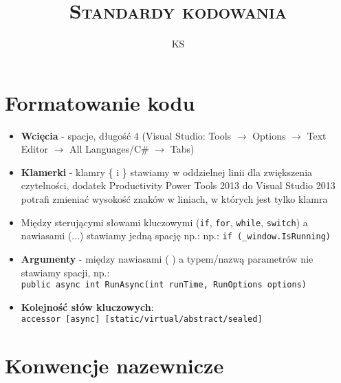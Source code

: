 \documentclass[a4paper]{article}
\title{\textsc{Standardy kodowania}}
\author{KS}
\begin{document}
	\maketitle
	
	\section{Formatowanie kodu}
	\begin{itemize}
		\item \textbf{Wcięcia} - spacje, długość 4 (Visual Studio: Tools $\rightarrow$ Options $\rightarrow$ Text Editor $\rightarrow$ All Languages/C\# $\rightarrow$ Tabs)
		\item \textbf{Klamerki} - klamry \{ i \} stawiamy w oddzielnej linii dla zwiększenia czytelności, dodatek Productivity Power Tools 2013 do Visual Studio 2013 potrafi zmieniać wysokość znaków w liniach, w których jest tylko klamra 
		\item Między sterującymi słowami kluczowymi (\texttt{if}, \texttt{for}, \texttt{while}, \texttt{switch}) a nawiasami (...) stawiamy jedną spację np.: np.: \texttt{if (\_window.IsRunning)}
		\item \textbf{Argumenty} - między nawiasami ( ) a typem/nazwą parametrów nie stawiamy spacji, np.:\\\texttt{public async int RunAsync(int runTime, RunOptions options)}
		\item \textbf{Kolejność słów kluczowych}:\\\texttt{accessor [async] [static/virtual/abstract/sealed]}
	\end{itemize}
	
	\section{Konwencje nazewnicze}
\end{document}
